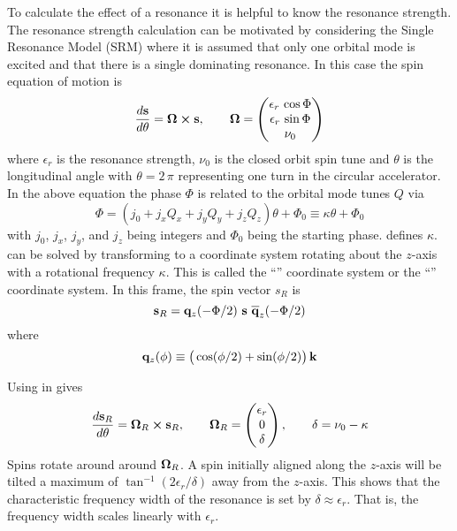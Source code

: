 To calculate the effect of a resonance it is helpful to know the resonance strength.  The resonance
strength calculation can be motivated by considering the Single Resonance Model
(SRM)\cite{b:spin.hoff} where it is assumed that only one orbital mode is excited and that there is
a single dominating resonance. In this case the spin equation of motion is
\begin{equation}
  \frac{d {\bf s}}{d \theta} = {\bf \Omega} \mathbin{\boldsymbol{\times}} {\bf s}, \qquad 
  {\bf \Omega} = \begin{pmatrix}
    \epsilon_r \, \cos \Phi \\
    \epsilon_r \, \sin \Phi \\
    \nu_0
  \end{pmatrix}
  \label{stos}
\end{equation}
where $\epsilon_r$ is the resonance strength, $\nu_0$ is the closed orbit spin tune and $\theta$ is
the longitudinal angle with $\theta = 2 \, \pi$ representing one turn in the circular accelerator.
In the above equation the phase $\Phi$ is related to the orbital mode tunes $Q$ via
\begin{equation}
  \Phi = (j_0 + j_x Q_x + j_y Q_y + j_z Q_z) \theta + \Phi_0 \equiv
  \kappa \theta + \Phi_0
\end{equation}
with $j_0$, $j_x$, $j_y$, and $j_z$ being integers and $\Phi_0$ being the starting phase. 
defines $\kappa$.  can be solved by transforming to a coordinate system rotating about the
$z$-axis with a rotational frequency $\kappa$. This is called the ``'' coordinate
system or the ``'' coordinate system. In this frame, the spin vector $s_R$ is
\begin{equation}
  \bfs_R = \bfq_z(-\Phi/2) \,\, \bfs \,\, \BAR\bfq_z(-\Phi/2) \\
  \label{rqsq}
\end{equation}
where
\begin{equation}
  {\bf q}_z(\phi) \equiv \big( \cos (\phi/2) +  \sin (\phi/2) \big) \, {\bf k}
\end{equation}

Using  in  gives
\begin{equation}
  \frac{d {\bf s}_R}{d \theta} = {\bf \Omega}_R \mathbin{\boldsymbol{\times}} {\bf s}_R, \qquad
  {\bf \Omega}_R = \begin{pmatrix}
    \epsilon_r \\
    0 \\
    \delta 
  \end{pmatrix},
  \qquad
  \delta = \nu_0 - \kappa
  \label{stos2}
\end{equation}
Spins rotate around around ${\bf \Omega}_R$. A spin initially aligned along the $z$-axis will be 
tilted a maximum of $\tan^{-1}(2\epsilon_r/\delta)$ away from the $z$-axis. This shows that the
characteristic frequency width of the resonance is set by $\delta \approx \epsilon_r$. That is,
the frequency width scales linearly with $\epsilon_r$.

